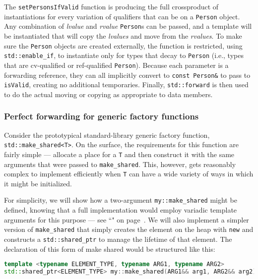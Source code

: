 \noindent The \texttt{setPersonsIfValid} function is producing the full crossproduct of instantiations for every variation of qualifiers that can be
on a \texttt{Person} object. Any combination of \emph{lvalue} and
\emph{rvalue} \texttt{Person}s can be passed, and a template will be
instantiated that will copy the \emph{lvalues} and move from the
\emph{rvalues}. To make sure the \texttt{Person} objects are
created externally, the function is restricted, using
\texttt{std::enable\_if}, to instantiate only for types that decay to
\texttt{Person} (i.e., types that are cv-qualified or ref-qualified
\texttt{Person}). Because each parameter is a forwarding reference, they
can all implicitly convert to \texttt{const}~\texttt{Person\&} to pass
to \texttt{isValid}, creating no additional temporaries. Finally,
\texttt{std::forward} is then used to do the actual moving or copying as
appropriate to data members.

\subsubsection[Perfect forwarding for generic factory functions]{Perfect forwarding for generic factory functions}\label{perfect-forwarding-for-generic-factory-functions}

Consider the prototypical standard-library generic factory function,
\texttt{std::make\_shared<T>}. On the surface, the requirements for this
function are fairly simple --- allocate a place for a \texttt{T} and
then construct it with the same arguments that were passed to
\texttt{make\_shared}. This, however, gets reasonably complex to
implement efficiently when \texttt{T} can have a wide variety of ways in
which it might be initialized.

For simplicity, we will show how a two-argument \texttt{my::make\_shared}
might be defined, knowing that a full implementation would employ
variadic template arguments for this purpose --- see ``" on page~\pageref{variable-templates}. We will also implement a simpler
version of \texttt{make\_shared} that simply creates the element on the
heap with \texttt{new} and constructs a \texttt{std::shared\_ptr} to
manage the lifetime of that element. The declaration of this form of
make shared would be structured like this:

\begin{lstlisting}[language=C++]
template <typename ELEMENT_TYPE, typename ARG1, typename ARG2>
std::shared_ptr<ELEMENT_TYPE> my::make_shared(ARG1&& arg1, ARG2&& arg2)
\end{lstlisting}
    
